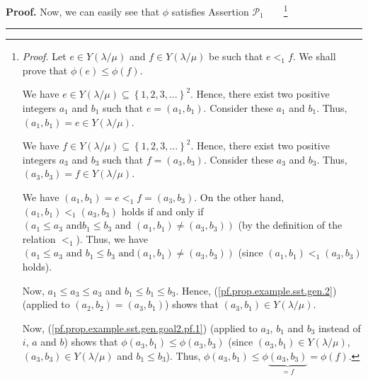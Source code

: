 \documentclass[numbers=enddot,12pt,final,onecolumn,notitlepage,abstracton]{scrartcl}
\theoremstyle{definition}
\newenvironment{proof}[1][Proof]{\noindent\textbf{#1.} }{\ \rule{0.5em}{0.5em}}
\newenvironment{verlong}{}{}
\begin{document}
\begin{verlong}
\begin{footnotesize}
\begin{proof}
Now, we can easily see that $\phi$ satisfies Assertion $\mathcal{P}_{1}%
$\ \ \ \ \footnote{\textit{Proof.} Let $e\in Y\left(  \lambda/\mu\right)  $
and $f\in Y\left(  \lambda/\mu\right)  $ be such that $e<_{1}f$. We shall
prove that $\phi\left(  e\right)  \leq\phi\left(  f\right)  $.
\par
We have $e\in Y\left(  \lambda/\mu\right)  \subseteq\left\{  1,2,3,\ldots
\right\}  ^{2}$. Hence, there exist two positive integers $a_{1}$ and $b_{1}$
such that $e=\left(  a_{1},b_{1}\right)  $. Consider these $a_{1}$ and $b_{1}%
$. Thus, $\left(  a_{1},b_{1}\right)  =e\in Y\left(  \lambda/\mu\right)  $.
\par
We have $f\in Y\left(  \lambda/\mu\right)  \subseteq\left\{  1,2,3,\ldots
\right\}  ^{2}$. Hence, there exist two positive integers $a_{3}$ and $b_{3}$
such that $f=\left(  a_{3},b_{3}\right)  $. Consider these $a_{3}$ and $b_{3}%
$. Thus, $\left(  a_{3},b_{3}\right)  =f\in Y\left(  \lambda/\mu\right)  $.
\par
We have $\left(  a_{1},b_{1}\right)  =e<_{1}f=\left(  a_{3},b_{3}\right)  $.
On the other hand, $\left(  a_{1},b_{1}\right)  <_{1}\left(  a_{3}%
,b_{3}\right)  $ holds if and only if $\left(  a_{1}\leq a_{3}\text{ and
}b_{1}\leq b_{3}\text{ and }\left(  a_{1},b_{1}\right)  \neq\left(
a_{3},b_{3}\right)  \right)  $ (by the definition of the relation $<_{1}$).
Thus, we have $\left(  a_{1}\leq a_{3}\text{ and }b_{1}\leq b_{3}\text{ and
}\left(  a_{1},b_{1}\right)  \neq\left(  a_{3},b_{3}\right)  \right)  $ (since
$\left(  a_{1},b_{1}\right)  <_{1}\left(  a_{3},b_{3}\right)  $ holds).
\par
Now, $a_{1}\leq a_{3}\leq a_{3}$ and $b_{1}\leq b_{1}\leq b_{3}$. Hence,
(\ref{pf.prop.example.sst.gen.2}) (applied to $\left(  a_{2},b_{2}\right)
=\left(  a_{3},b_{1}\right)  $) shows that $\left(  a_{3},b_{1}\right)  \in
Y\left(  \lambda/\mu\right)  $.
\par
Now, (\ref{pf.prop.example.sst.gen.goal2.pf.1}) (applied to $a_{3}$, $b_{1}$
and $b_{3}$ instead of $i$, $a$ and $b$) shows that $\phi\left(  a_{3}%
,b_{1}\right)  \leq\phi\left(  a_{3},b_{3}\right)  $ (since $\left(
a_{3},b_{1}\right)  \in Y\left(  \lambda/\mu\right)  $, $\left(  a_{3}%
,b_{3}\right)  \in Y\left(  \lambda/\mu\right)  $ and $b_{1}\leq b_{3}$).
Thus, $\phi\left(  a_{3},b_{1}\right)  \leq\phi\underbrace{\left(  a_{3}%
,b_{3}\right)  }_{=f}=\phi\left(  f\right)  $.
\par
}
\end{proof}
\end{footnotesize}
\end{verlong}
\end{document}
